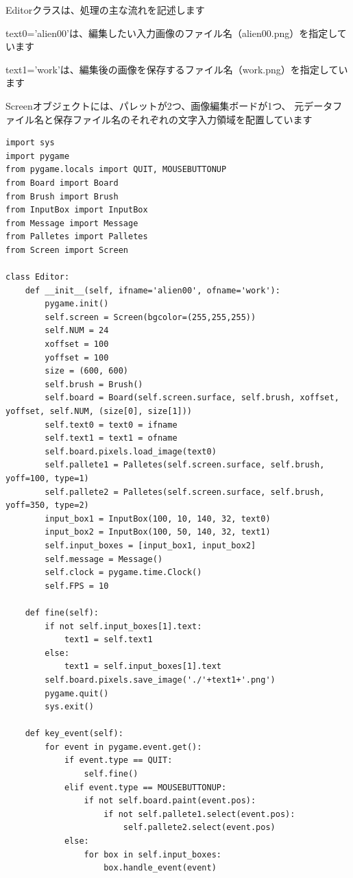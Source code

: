 \documentclass[uplatex,a4paper,11pt,oneside,openany]{jsbook}
\begin{document}
Editorクラスは、処理の主な流れを記述します

text0='alien00'は、編集したい入力画像のファイル名（alien00.png）を指定しています

text1='work'は、編集後の画像を保存するファイル名（work.png）を指定しています

Screenオブジェクトには、パレットが2つ、画像編集ボードが1つ、
元データファイル名と保存ファイル名のそれぞれの文字入力領域を配置しています

\begin{lstlisting}[caption=class Editor,label=pr02]
import sys
import pygame
from pygame.locals import QUIT, MOUSEBUTTONUP
from Board import Board
from Brush import Brush
from InputBox import InputBox
from Message import Message
from Palletes import Palletes
from Screen import Screen

class Editor:
    def __init__(self, ifname='alien00', ofname='work'):
        pygame.init()
        self.screen = Screen(bgcolor=(255,255,255))
        self.NUM = 24
        xoffset = 100
        yoffset = 100
        size = (600, 600)
        self.brush = Brush()
        self.board = Board(self.screen.surface, self.brush, xoffset, yoffset, self.NUM, (size[0], size[1]))
        self.text0 = text0 = ifname
        self.text1 = text1 = ofname
        self.board.pixels.load_image(text0)
        self.pallete1 = Palletes(self.screen.surface, self.brush, yoff=100, type=1)
        self.pallete2 = Palletes(self.screen.surface, self.brush, yoff=350, type=2)
        input_box1 = InputBox(100, 10, 140, 32, text0)
        input_box2 = InputBox(100, 50, 140, 32, text1)
        self.input_boxes = [input_box1, input_box2]
        self.message = Message()
        self.clock = pygame.time.Clock()
        self.FPS = 10

    def fine(self):
        if not self.input_boxes[1].text:
            text1 = self.text1
        else:
            text1 = self.input_boxes[1].text
        self.board.pixels.save_image('./'+text1+'.png')
        pygame.quit()
        sys.exit()

    def key_event(self):
        for event in pygame.event.get():
            if event.type == QUIT:
                self.fine()
            elif event.type == MOUSEBUTTONUP:
                if not self.board.paint(event.pos):
                    if not self.pallete1.select(event.pos):
                        self.pallete2.select(event.pos)
            else:
                for box in self.input_boxes:
                    box.handle_event(event)


\end{lstlisting}
\end{document}
